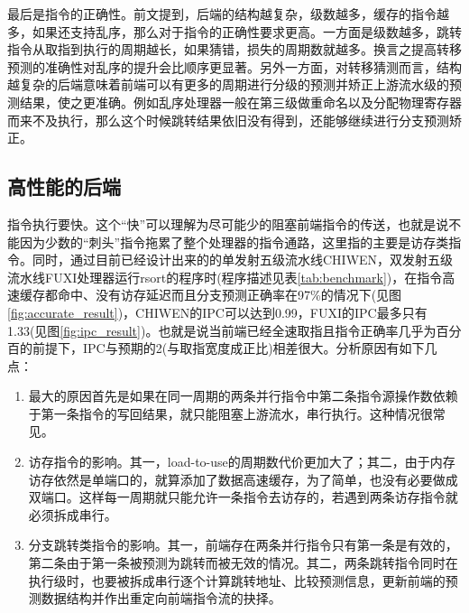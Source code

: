 	最后是指令的正确性。前文提到，后端的结构越复杂，级数越多，缓存的指令越多，如果还支持乱序，那么对于指令的正确性要求更高。一方面是级数越多，跳转指令从取指到执行的周期越长，如果猜错，损失的周期数就越多。换言之提高转移预测的准确性对乱序的提升会比顺序更显著。另外一方面，对转移猜测而言，结构越复杂的后端意味着前端可以有更多的周期进行分级的预测并矫正上游流水级的预测结果，使之更准确。例如乱序处理器一般在第三级做重命名以及分配物理寄存器而来不及执行，那么这个时候跳转结果依旧没有得到，还能够继续进行分支预测矫正。
	
	\subsection{高性能的后端}
	
	指令执行要快。这个``快''可以理解为尽可能少的阻塞前端指令的传送，也就是说不能因为少数的``刺头''指令拖累了整个处理器的指令通路，这里指的主要是访存类指令。同时，通过目前已经设计出来的的单发射五级流水线CHIWEN，双发射五级流水线FUXI处理器运行rsort的程序时(程序描述见表\ref{tab:benchmark})，在指令高速缓存都命中、没有访存延迟而且分支预测正确率在97\%的情况下(见图\ref{fig:accurate_result})，CHIWEN的IPC可以达到0.99，FUXI的IPC最多只有1.33(见图\ref{fig:ipc_result})。也就是说当前端已经全速取指且指令正确率几乎为百分百的前提下，IPC与预期的2(与取指宽度成正比)相差很大。分析原因有如下几点：
	\begin{enumerate}[label=(\alph*)]
		\item 最大的原因首先是如果在同一周期的两条并行指令中第二条指令源操作数依赖于第一条指令的写回结果，就只能阻塞上游流水，串行执行。这种情况很常见。
		\item 访存指令的影响。其一，load-to-use的周期数代价更加大了；其二，由于内存访存依然是单端口的，就算添加了数据高速缓存，为了简单，也没有必要做成双端口。这样每一周期就只能允许一条指令去访存的，若遇到两条访存指令就必须拆成串行。
		\item 分支跳转类指令的影响。其一，前端存在两条并行指令只有第一条是有效的，第二条由于第一条被预测为跳转而被无效的情况。其二，两条跳转指令同时在执行级时，也要被拆成串行逐个计算跳转地址、比较预测信息，更新前端的预测数据结构并作出重定向前端指令流的抉择。
	\end{enumerate}

